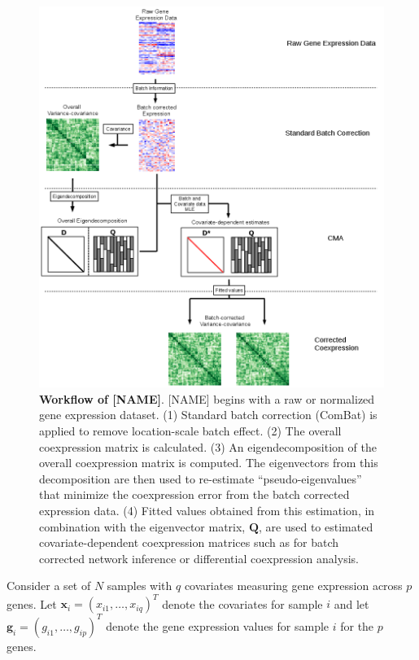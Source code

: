 \begin{figure}
\includegraphics[width=1\columnwidth]{figures/overview2}\caption[Workflow of {[}NAME{]}]{\textbf{Workflow of {[}NAME{]}}. {[}NAME{]} begins with a raw or normalized
gene expression dataset. (1) Standard batch correction (ComBat) is
applied to remove location-scale batch effect. (2) The overall coexpression
matrix is calculated. (3) An eigendecomposition of the overall coexpression
matrix is computed. The eigenvectors from this decomposition are then
used to re-estimate ``pseudo-eigenvalues'' that minimize the coexpression
error from the batch corrected expression data. (4) Fitted values
obtained from this estimation, in combination with the eigenvector
matrix, $\mathbf{Q}$, are used to estimated covariate-dependent coexpression
matrices such as for batch corrected network inference or differential
coexpression analysis.}
\end{figure}

Consider a set of $N$ samples with $q$ covariates measuring gene
expression across $p$ genes. Let $\textbf{x}_{i}=(x_{i1},\dots,x_{iq})^{T}$
denote the covariates for sample $i$ and let $\textbf{g}_{i}=(g_{i1},\dots,g_{ip})^T$
denote the gene expression values for sample $i$ for the $p$ genes.


